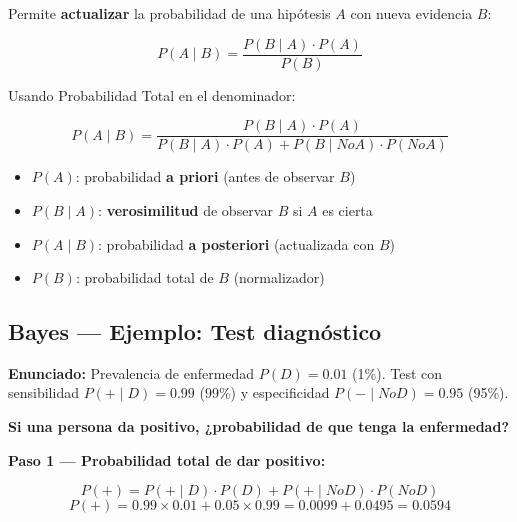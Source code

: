 \documentclass[
  letterpaper,
  DIV=11,
  numbers=noendperiod]{scrartcl}
\providecommand{\tightlist}{%
  \setlength{\itemsep}{0pt}\setlength{\parskip}{0pt}}
\begin{document}
\begin{tcolorbox}[enhanced jigsaw, arc=.35mm, bottomrule=.15mm, bottomtitle=1mm, breakable, colback=white, colbacktitle=quarto-callout-important-color!10!white, colframe=quarto-callout-important-color-frame, coltitle=black, left=2mm, leftrule=.75mm, opacityback=0, opacitybacktitle=0.6, rightrule=.15mm, title=\textcolor{quarto-callout-important-color}{\faExclamation}\hspace{0.5em}{Important}, titlerule=0mm, toprule=.15mm, toptitle=1mm]

Permite \textbf{actualizar} la probabilidad de una hipótesis \(A\) con
nueva evidencia \(B\):

\[P(A \mid B) = \frac{P(B \mid A) \cdot P(A)}{P(B)}\]

Usando Probabilidad Total en el denominador:

\[P(A \mid B) = \frac{P(B \mid A) \cdot P(A)}{P(B \mid A) \cdot P(A) + P(B \mid NoA) \cdot P(NoA)}\]

\end{tcolorbox}

\begin{itemize}
\tightlist
\item
  \(P(A)\): probabilidad \textbf{a priori} (antes de observar \(B\))
\item
  \(P(B \mid A)\): \textbf{verosimilitud} de observar \(B\) si \(A\) es
  cierta
\item
  \(P(A \mid B)\): probabilidad \textbf{a posteriori} (actualizada con
  \(B\))
\item
  \(P(B)\): probabilidad total de \(B\) (normalizador)
\end{itemize}

\subsection{Bayes --- Ejemplo: Test
diagnóstico}\label{bayes-ejemplo-test-diagnostico}

\textbf{Enunciado:} Prevalencia de enfermedad \(P(D)=0.01\) (1\%). Test
con sensibilidad \(P(+ \mid D)=0.99\) (99\%) y especificidad
\(P(- \mid NoD)=0.95\) (95\%).

\textbf{Si una persona da positivo, ¿probabilidad de que tenga la
enfermedad?}

\textbf{Paso 1 --- Probabilidad total de dar positivo:}

\[P(+) = P(+ \mid D) \cdot P(D) + P(+ \mid NoD) \cdot P(NoD)\]
\[P(+) = 0.99 \times 0.01 + 0.05 \times 0.99 = 0.0099 + 0.0495 = 0.0594\]
\end{document}
